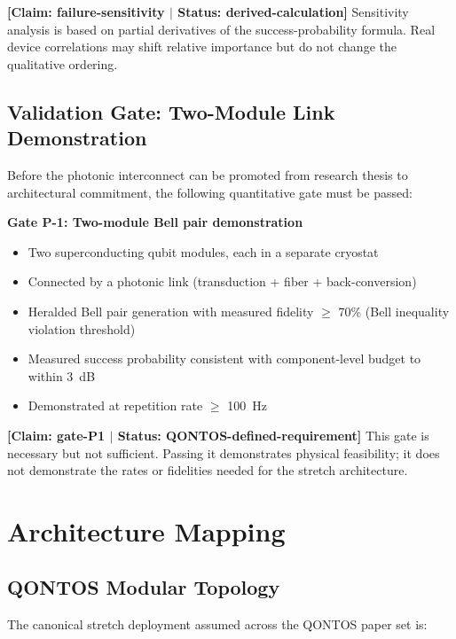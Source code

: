 \documentclass[conference]{IEEEtran}
\begin{document}
\textbf{[Claim: failure-sensitivity $|$ Status: derived-calculation]} Sensitivity analysis is based on partial derivatives of the success-probability formula. Real device correlations may shift relative importance but do not change the qualitative ordering.

\subsection{Validation Gate: Two-Module Link Demonstration}

Before the photonic interconnect can be promoted from research thesis to architectural commitment, the following quantitative gate must be passed:

\textbf{Gate P-1: Two-module Bell pair demonstration}
\begin{itemize}
\item Two superconducting qubit modules, each in a separate cryostat
\item Connected by a photonic link (transduction + fiber + back-conversion)
\item Heralded Bell pair generation with measured fidelity $\geq$ 70\% (Bell inequality violation threshold)
\item Measured success probability consistent with component-level budget to within 3~dB
\item Demonstrated at repetition rate $\geq$ 100~Hz
\end{itemize}

\textbf{[Claim: gate-P1 $|$ Status: QONTOS-defined-requirement]} This gate is necessary but not sufficient. Passing it demonstrates physical feasibility; it does not demonstrate the rates or fidelities needed for the stretch architecture.

\section{Architecture Mapping}

\subsection{QONTOS Modular Topology}

The canonical stretch deployment assumed across the QONTOS paper set is:
\end{document}
